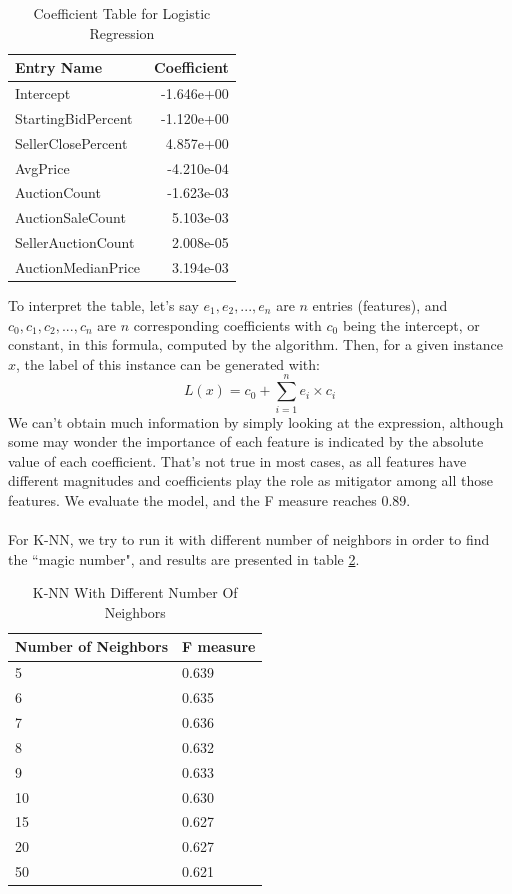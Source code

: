 \documentclass[CEJM,PDF]{cej} %
\begin{document}
\begin{table}[h]
\centering
\caption{Coefficient Table for Logistic Regression}
\label{r-lr}
\begin{tabular}{@{}|l|r|@{}}
\toprule
\hline
Entry Name  & Coefficient \\ \midrule
\hline
Intercept & -1.646e+00   \\
\hline
StartingBidPercent & -1.120e+00 \\
\hline
SellerClosePercent & 4.857e+00  \\
\hline
AvgPrice & -4.210e-04 \\
\hline
AuctionCount & -1.623e-03   \\
\hline
AuctionSaleCount & 5.103e-03 \\
\hline
SellerAuctionCount & 2.008e-05   \\
\hline
AuctionMedianPrice & 3.194e-03  \\ \bottomrule
\hline
\end{tabular}
\end{table}

To interpret the table, let's say $e_1, e_2, ..., e_n$ are $n$ entries (features), and $c_0, c_1, c_2, ..., c_n$ are $n$ corresponding coefficients with $c_0$ being the intercept, or constant, in this formula, computed by the algorithm. Then, for a given instance $x$, the label of this instance can be generated with:
$$L(x) = c_0 + \sum_{i=1}^{n}e_i\times c_i$$
We can't obtain much information by simply looking at the expression, although some may wonder the importance of each feature is indicated by the absolute value of each coefficient. That's not true in most cases, as all features have different magnitudes and coefficients play the role as mitigator among all those features. We evaluate the model, and the F measure reaches 0.89.\\
\\
For K-NN, we try to run it with different number of neighbors in order to find the ``magic number", and results are presented in table \ref{r-knn}.

\begin{table}[h]
\centering
\caption{K-NN With Different Number Of Neighbors}
\label{r-knn}
\begin{tabular}{@{}|l|l|@{}}
\toprule
\hline
Number of Neighbors  & F measure \\ \midrule
\hline
5 & 0.639   \\
\hline
6 & 0.635   \\
\hline
7  & 0.636  \\
\hline
8 & 0.632   \\
\hline
9  & 0.633  \\ 
\hline
10 & 0.630 \\ 
\hline
15 & 0.627 \\ 
\hline
20 & 0.627 \\
\hline
50 & 0.621 \\ \bottomrule
\hline
\end{tabular}
\end{table}
\end{document}
